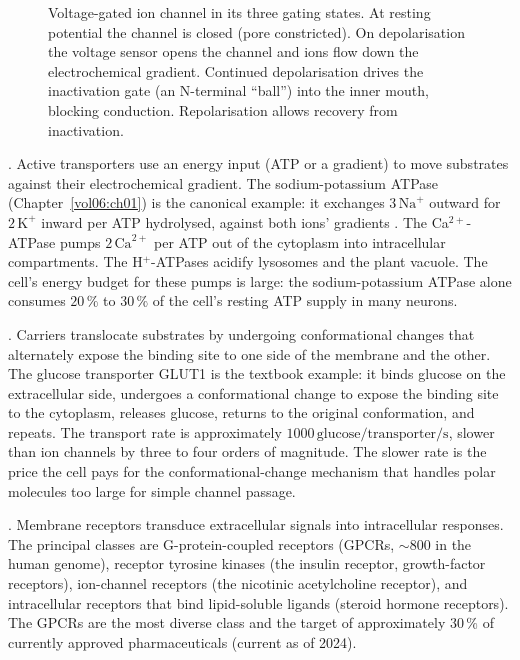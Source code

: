 \begin{figure}[ht]
\centering

\caption{Voltage-gated ion channel in its three gating states. At
resting potential the channel is closed (pore constricted). On
depolarisation the voltage sensor opens the channel and ions flow
down the electrochemical gradient. Continued depolarisation drives
the inactivation gate (an N-terminal ``ball'') into the inner mouth,
blocking conduction. Repolarisation allows recovery from inactivation.}
\label{fig:v6c04-channel}
\end{figure}

. Active transporters use an energy input (ATP or a
gradient) to move substrates against their electrochemical gradient.
The sodium-potassium ATPase (Chapter~\ref{vol06:ch01}) is the
canonical example: it exchanges $3\,\text{Na}^+$ outward for
$2\,\text{K}^+$ inward per ATP hydrolysed, against both ions'
gradients \cite{paper:v6c04-skou-1957}. The Ca$^{2+}$-ATPase pumps
$2\,\text{Ca}^{2+}$ per ATP out of the cytoplasm into intracellular
compartments. The H$^+$-ATPases acidify lysosomes and the plant
vacuole. The cell's energy budget for these pumps is large: the
sodium-potassium ATPase alone consumes $20\,\%$ to $30\,\%$ of the
cell's resting ATP supply in many neurons.

. Carriers translocate substrates by undergoing
conformational changes that alternately expose the binding site to
one side of the membrane and the other. The glucose transporter
GLUT1 is the textbook example: it binds glucose on the extracellular
side, undergoes a conformational change to expose the binding site
to the cytoplasm, releases glucose, returns to the original
conformation, and repeats. The transport rate is approximately
$1000\,\text{glucose}/\text{transporter}/\text{s}$, slower than ion
channels by three to four orders of magnitude. The slower rate is
the price the cell pays for the conformational-change mechanism
that handles polar molecules too large for simple channel passage.

. Membrane receptors transduce extracellular
signals into intracellular responses. The principal classes are
G-protein-coupled receptors (GPCRs, $\sim 800$ in the human genome),
receptor tyrosine kinases (the insulin receptor, growth-factor
receptors), ion-channel receptors (the nicotinic acetylcholine
receptor), and intracellular receptors that bind lipid-soluble ligands
(steroid hormone receptors). The GPCRs are the most diverse class
and the target of approximately $30\,\%$ of currently approved
pharmaceuticals (current as of 2024).

